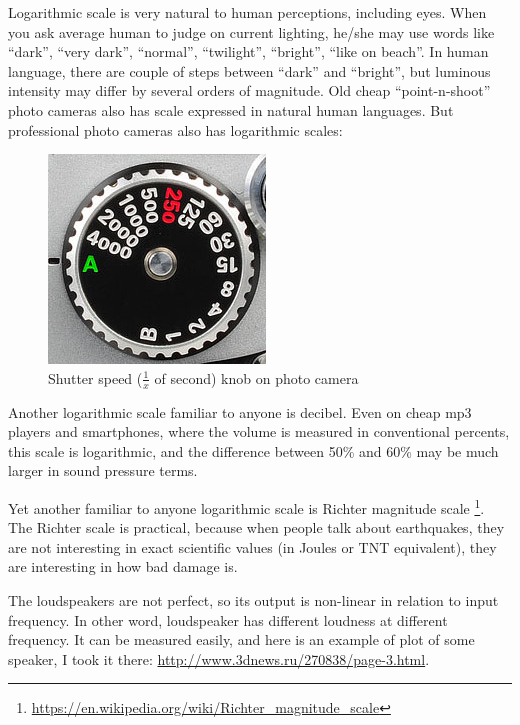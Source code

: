
\leveldown{}


Logarithmic scale is very natural to human perceptions, including eyes.
When you ask average human to judge on current lighting, he/she may use words like ``dark'', ``very dark'', ``normal'', ``twilight'', ``bright'', 
``like on beach''.
In human language, there are couple of steps between ``dark'' and ``bright'', but luminous intensity may differ by several orders of magnitude.
Old cheap ``point-n-shoot'' photo cameras also has scale expressed in natural human languages.
But professional photo cameras also has logarithmic scales:

\begin{figure}[H]
\centering
\includegraphics[scale=0.66]{log/nikon.jpg}
\caption{Shutter speed ($\frac{1}{x}$ of second) knob on photo camera}
\end{figure}

Another logarithmic scale familiar to anyone is decibel.
Even on cheap mp3 players and smartphones, where the volume is measured in conventional percents, this scale is logarithmic, 
and the difference between 50\% and 60\% may be much larger in sound pressure terms.

Yet another familiar to anyone logarithmic scale is Richter magnitude scale
\footnote{\url{https://en.wikipedia.org/wiki/Richter_magnitude_scale}}.
The Richter scale is practical, because when people talk about earthquakes, they are not interesting in exact scientific values
(in Joules or TNT equivalent), they are interesting in how bad damage is.


The loudspeakers are not perfect, so its output is non-linear in relation to input frequency.
In other word, loudspeaker has different loudness at different frequency.
It can be measured easily, and here is an example of plot of some speaker, I took it there:
\url{http://www.3dnews.ru/270838/page-3.html}.

